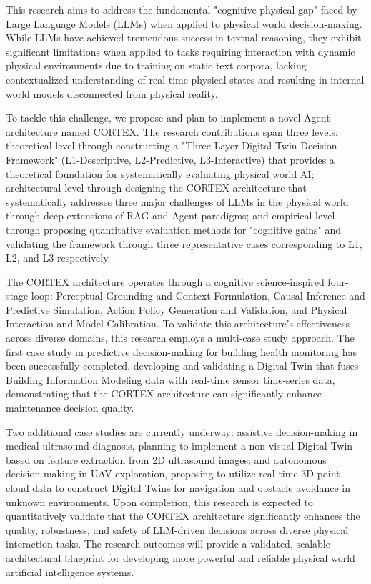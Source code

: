 
This research aims to address the fundamental "cognitive-physical gap" faced by Large Language Models (LLMs) when applied to physical world decision-making. While LLMs have achieved tremendous success in textual reasoning, they exhibit significant limitations when applied to tasks requiring interaction with dynamic physical environments due to training on static text corpora, lacking contextualized understanding of real-time physical states and resulting in internal world models disconnected from physical reality.

To tackle this challenge, we propose and plan to implement a novel Agent architecture named CORTEX. The research contributions span three levels: theoretical level through constructing a "Three-Layer Digital Twin Decision Framework" (L1-Descriptive, L2-Predictive, L3-Interactive) that provides a theoretical foundation for systematically evaluating physical world AI; architectural level through designing the CORTEX architecture that systematically addresses three major challenges of LLMs in the physical world through deep extensions of RAG and Agent paradigms; and empirical level through proposing quantitative evaluation methods for "cognitive gains" and validating the framework through three representative cases corresponding to L1, L2, and L3 respectively.

The CORTEX architecture operates through a cognitive science-inspired four-stage loop: Perceptual Grounding and Context Formulation, Causal Inference and Predictive Simulation, Action Policy Generation and Validation, and Physical Interaction and Model Calibration. To validate this architecture's effectiveness across diverse domains, this research employs a multi-case study approach. The first case study in predictive decision-making for building health monitoring has been successfully completed, developing and validating a Digital Twin that fuses Building Information Modeling data with real-time sensor time-series data, demonstrating that the CORTEX architecture can significantly enhance maintenance decision quality.

Two additional case studies are currently underway: assistive decision-making in medical ultrasound diagnosis, planning to implement a non-visual Digital Twin based on feature extraction from 2D ultrasound images; and autonomous decision-making in UAV exploration, proposing to utilize real-time 3D point cloud data to construct Digital Twins for navigation and obstacle avoidance in unknown environments. Upon completion, this research is expected to quantitatively validate that the CORTEX architecture significantly enhances the quality, robustness, and safety of LLM-driven decisions across diverse physical interaction tasks. The research outcomes will provide a validated, scalable architectural blueprint for developing more powerful and reliable physical world artificial intelligence systems.